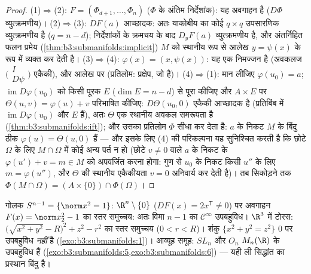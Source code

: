 \begin{proof}
(1)$\Rightarrow$(2): $F = (\Phi_{d+1}, \dots, \Phi_n)$ ($\Phi$ के अंतिम निर्देशांक): यह अवगाहन है
($D\Phi$ व्युत्क्रमणीय)।
(2)$\Rightarrow$(3): $DF(a)$ आच्छादक: अतः याकोबीय का कोई $q \times q$ उपसारणिक
व्युत्क्रमणीय है ($q = n - d$); निर्देशांकों के क्रमचय के बाद $D_yF(a)$
व्युत्क्रमणीय है, और अंतर्निहित फलन प्रमेय (\cref{thm:b3:submanifolds:implicit}) $M$ को
स्थानीय रूप से आलेख $y = \psi(x)$ के रूप में व्यक्त कर देती है।
(3)$\Rightarrow$(4): $\varphi(x) = (x, \psi(x))$: यह एक निमज्जन है (अवकलज $\bigl(\begin{smallmatrix}I\\
D\psi\end{smallmatrix}\bigr)$ एकैकी), और
आलेख पर  (प्रतिलोम: प्रक्षेप, जो  है)।
(4)$\Rightarrow$(1): मान लीजिए $\varphi(u_0) = a$; $\operatorname{im}D\varphi(u_0)$ को किसी पूरक $E$ ($\dim E = n - d$) से
पूरा कीजिए और $A\times E$ पर $\Theta(u, v) = \varphi(u) + v$ परिभाषित कीजिए: $D\Theta(u_0, 0)$ एकैकी आच्छादक
है (प्रतिबिंब में $\operatorname{im}D\varphi(u_0)$ और $E$ हैं), अतः $\Theta$ एक स्थानीय अवकल
समरूपता है (\cref{thm:b3:submanifolds:ift}); और उसका प्रतिलोम $\Phi$ सीधा कर देता है:
$a$ के निकट $M$ के बिंदु ठीक $\varphi(u) = \Theta(u, 0)$ हैं --- और इसके लिए (4) की
 परिकल्पना यह सुनिश्चित करती है कि छोटे $\Omega$ के लिए
$M\cap\Omega$ में कोई अन्य पर्त न हो (छोटे $v \neq 0$ वाले $a$ के निकट के
$\varphi(u') + v = m \in
M$ को अपवर्जित करना होगा:  गुण से $u_0$ के निकट किसी
$u''$ के लिए $m = \varphi(u'')$, और $\Theta$ की स्थानीय एकैकीयता $v = 0$ अनिवार्य
कर देती है)। तब सिकोड़ने तक $\Phi(M\cap\Omega) = (A\times\{0\})
\cap\Phi(\Omega)$।
\end{proof}

\begin{example}\label{ex:b3:submanifolds:examples}
गोलक $S^{n-1} = \{\norm x^2 = 1\}$: $\R^n\setminus\{0\}$ ($DF(x) = 2x^{\mathsf T} \ne 0$) पर अवगाहन $F(x) = \norm x_2^2 - 1$ का स्तर समुच्चय: अतः
विमा $n - 1$ का $\mathcal C^\infty$ उपबहुविध। $\R^3$ में टोरस: $\bigl(\sqrt{x^2 + y^2} -
R\bigr)^2 + z^2 - r^2$ का स्तर
समुच्चय ($0 < r < R$)। शंकु $\{x^2 + y^2 =
z^2\}$ $0$ पर उपबहुविध \emph{नहीं} है
(\cref{exo:b3:submanifolds:1})। आव्यूह समूह: $SL_n$ और $O_n$ $M_n(\R)$ के उपबहुविध हैं
(\cref{exo:b3:submanifolds:5,exo:b3:submanifolds:6}) --- यही ली सिद्धांत का प्रस्थान बिंदु है।
\end{example}

